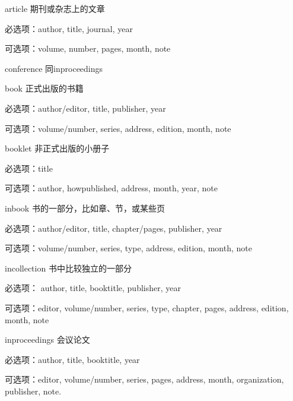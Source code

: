 \begin{compactdesc}
    \item [article] 期刊或杂志上的文章 
        \begin{compactitem}
            \item 必选项：author, title, journal, year
            \item 可选项：volume, number, pages, month, note
        \end{compactitem}
    \item [conference] 同inproceedings
    \item [book] 正式出版的书籍
        \begin{compactitem}
            \item 必选项：author/editor, title, publisher, year
            \item 可选项：volume/number, series, address, edition, month, note
        \end{compactitem}
    \item [booklet] 非正式出版的小册子
        \begin{compactitem}
            \item 必选项：title
            \item 可选项：author, howpublished, address, month, year, note
        \end{compactitem}
    \item [inbook] 书的一部分，比如章、节，或某些页
        \begin{compactitem}
            \item 必选项：author/editor, title, chapter/pages, publisher, year
            \item 可选项：volume/number, series, type, address, edition, month, note
        \end{compactitem}
    \item [incollection] 书中比较独立的一部分
        \begin{compactitem}
            \item 必选项： author, title, booktitle, publisher, year 
            \item 可选项：editor, volume/number, series, type, chapter, pages, address, edition, month, note
        \end{compactitem}
    \item [inproceedings] 会议论文
        \begin{compactitem}
            \item 必选项：author, title, booktitle, year
            \item 可选项：editor, volume/number, series, pages, address, month,  organization, publisher, note.

\end{compactitem}
\end{compactdesc}

